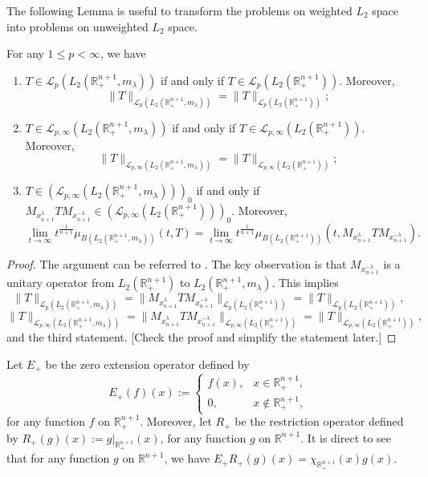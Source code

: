 \documentclass[12pt]{amsart}
\begin{document}
The following Lemma is useful to transform the problems on weighted $L_2$ space into problems on unweighted $L_2$ space.
\begin{lemma}\label{weight}
For any  $1\leq p<\infty$, we have
\begin{enumerate}
  \item $T\in\mathcal{L}_{p}(L_2(\mathbb{R}_+^{n+1},m_\lambda))$ if and only if $T\in\mathcal{L}_{p}(L_2(\mathbb{R}_+^{n+1}))$. Moreover,
      $$\|T\|_{\mathcal{L}_{p}(L_2(\mathbb{R}_+^{n+1},m_\lambda))}=\|T\|_ {\mathcal{L}_{p}(L_2(\mathbb{R}_+^{n+1}))};$$
  \item $T\in\mathcal{L}_{p,\infty}(L_2(\mathbb{R}_+^{n+1},m_\lambda))$ if and only if $T\in\mathcal{L}_{p,\infty}(L_2(\mathbb{R}_+^{n+1}))$. Moreover,
      $$\|T\|_{\mathcal{L}_{p,\infty}(L_2(\mathbb{R}_+^{n+1},m_\lambda))}=\|T\|_ {\mathcal{L}_{p,\infty}(L_2(\mathbb{R}_+^{n+1}))};$$
  \item $T\in(\mathcal{L}_{p,\infty}(L_2(\mathbb{R}_+^{n+1},m_\lambda)))_0$ if and only if $M_{x_{n+1}^\lambda}TM_{x_{n+1}^{-\lambda}}\in(\mathcal{L}_{p,\infty}(L_2(\mathbb{R}_+^{n+1})))_0$. Moreover,
      $$\lim_{t\to\infty}t^{\frac1{n+1}}\mu_{B(L_2(\mathbb{R}^{n+1}_+,m_{\lambda}))}(t,T)=\lim_{t\to\infty}t^{\frac1{n+1}}\mu_{B(L_2(\mathbb{R}^{n+1}_+))}(t,M_{x_{n+1}^\lambda}TM_{x_{n+1}^{-\lambda}}).$$
\end{enumerate}
\end{lemma}
\begin{proof}
The argument can be referred to \cite[Lemma 2.7]{MR4706933}. The key observation is that $M_{x_{n+1}^{-\lambda}}$ is a unitary operator from $L_2(\mathbb{R}_+^{n+1})$ to $L_2(\mathbb{R}_+^{n+1},m_\lambda)$. This implies
$$\|T\|_{\mathcal{L}_{p}(L_2(\mathbb{R}_+^{n+1},m_\lambda))}=\|M_{x_{n+1}^\lambda}TM_{x_{n+1}^{-\lambda}}\|_ {\mathcal{L}_{p}(L_2(\mathbb{R}_+^{n+1}))}=\|T\|_ {\mathcal{L}_{p}(L_2(\mathbb{R}_+^{n+1}))},$$
$$\|T\|_{\mathcal{L}_{p,\infty}(L_2(\mathbb{R}_+^{n+1},m_\lambda))}=\|M_{x_{n+1}^\lambda}TM_{x_{n+1}^{-\lambda}}\|_ {\mathcal{L}_{p,\infty}(L_2(\mathbb{R}_+^{n+1}))}=\|T\|_ {\mathcal{L}_{p,\infty}(L_2(\mathbb{R}_+^{n+1}))},$$
and the third statement.
{\color{blue}[Check the proof and simplify the statement later.]}
\end{proof}
Let $E_+$ be the zero extension operator defined by
$$E_+(f)(x):=\begin{cases}
f(x),& x\in \mathbb{R}_+^{n+1},\\
0,& x\notin \mathbb{R}_+^{n+1},
\end{cases}
$$
for any function $f$ on $\mathbb{R}_+^{n+1}$.
Moreover, let $R_+$ be the restriction operator defined by $R_+(g)(x):=g\big|_{\mathbb{R}_+^{n+1}}(x)$, for any function $g$ on $\mathbb{R}^{n+1}$. It is direct to see that for any function $g$ on $\mathbb{R}^{n+1}$, we have $E_+R_+(g)(x)=\chi_{\mathbb{R}_+^{n+1}}(x)g(x)$.
\end{document}
